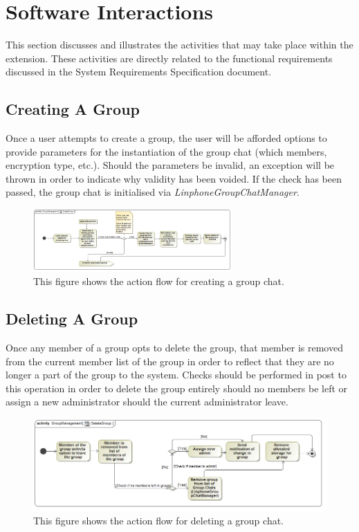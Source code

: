 \documentclass[11pt]{article}
\begin{document}
\section{Software Interactions}
This section discusses and illustrates the activities that may take place within the extension. These activities are directly related to the functional requirements discussed in the System Requirements Specification document.
\subsection{Creating A Group}
Once a user attempts to create a group, the user will be afforded options to provide parameters for the instantiation of the group chat (which members, encryption type, etc.). Should the parameters be invalid, an exception will be thrown in order to indicate why validity has been voided. If the check has been passed, the group chat is initialised via \textit{LinphoneGroupChatManager}.
\begin{figure}[H]
\centering
\includegraphics[width=3in]{./images/activity_create_group.png}
\caption[Create Group Activity Diagram]{This figure shows the action flow for creating a group chat.}
\label{ad-create-group}
\end{figure}
\subsection{Deleting A Group}
Once any member of a group opts to delete the group, that member is removed from the current member list of the group in order to reflect that they are no longer a part of the group to the system. Checks should be performed in post to this operation in order to delete the group entirely should no members be left or assign a new administrator should the current administrator leave.
\begin{figure}[H]
\centering
\includegraphics[width=5in]{./images/activity_delete_group.png}
\caption[Delete Group Activity Diagram]{This figure shows the action flow for deleting a group chat.}
\label{ad-delete-group}
\end{figure}
\end{document}
